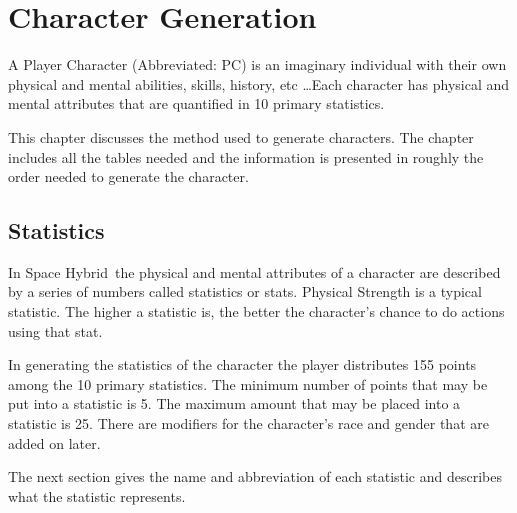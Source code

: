 \chapter{Character Generation}

A {Player Character} (Abbreviated: PC) is an imaginary individual with their
own physical and mental abilities, skills, history,  etc \dots Each 
character has physical and mental attributes that are quantified in 
10 primary statistics. 

This chapter discusses the method used to generate characters. The chapter 
includes all the tables needed and the information is presented in roughly 
the order needed to generate the character.

\section{Statistics}

In Space Hybrid\ the physical and mental attributes of a character 
are described by a series of numbers called {statistics} or stats. 
Physical Strength is a typical statistic. The higher a
statistic is, the better the character's chance to do actions using  
that stat. 

In generating the statistics of the character the player distributes 155
points among the 10 primary statistics. The minimum number of points that may be
put into a statistic is 5. The maximum amount that may be placed into
a statistic is 25. There are modifiers for the character's race and gender that 
are added on later. 

The next section gives the name and abbreviation of each statistic and 
describes what the statistic represents.

\newpage
\small

